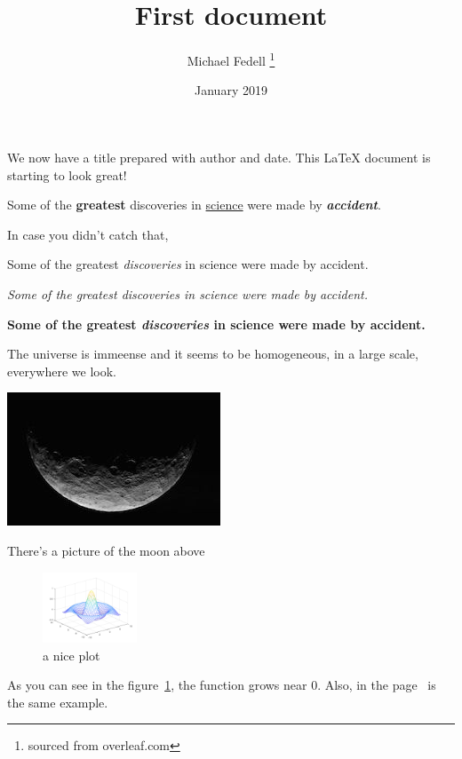 \documentclass[12pt, letterpaper]{article}
\title{First document}
\author{Michael Fedell \thanks{sourced from overleaf.com}}
\date{January 2019}
\begin{document}
\maketitle
We now have a title prepared with author and date.
This \LaTeX{} document is starting to look great!

\newpage

Some of the \textbf{greatest}
discoveries in \underline{science}
were made by \textbf{\textit{accident}}.


In case you didn't catch that,

Some of the greatest \emph{discoveries}
in science
were made by accident.

\textit{Some of the greatest \emph{discoveries}
in science
were made by accident.}

\textbf{Some of the greatest \emph{discoveries}
in science
were made by accident.}

\newpage

The universe is immeense and it seems to be homogeneous, in a large scale, everywhere we look.

\includegraphics{moon}

There's a picture of the moon above

\newpage

\begin{figure}[h]
    \centering
    \includegraphics[width=0.25\textwidth]{mesh}
    \caption{a nice plot}
    \label{fig:mesh1}
\end{figure}

As you can see in the figure~\ref{fig:mesh1}, the
function grows near 0. Also, in the page~\pageref{fig:mesh1}
is the same example.
\end{document}
